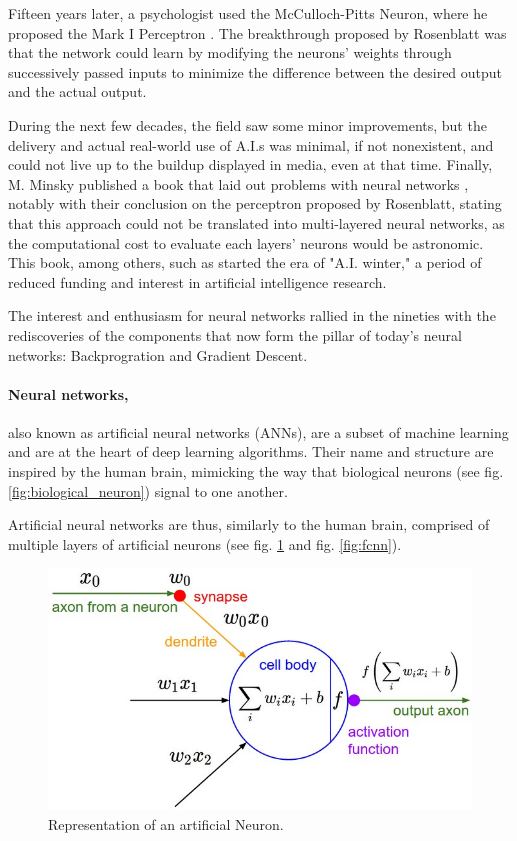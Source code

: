 Fifteen years later, a psychologist used the McCulloch-Pitts Neuron, where he
proposed the Mark I Perceptron \cite{brain_perceptron_1958}. The breakthrough
proposed by Rosenblatt was that the network could learn by modifying the
neurons' weights through successively passed inputs to minimize the difference
between the desired output and the actual output.

During the next few decades, the field saw some minor improvements, but the
delivery and actual real-world use of A.I.s was minimal, if not nonexistent, and
could not live up to the buildup displayed in media, even at that time. Finally,
M. Minsky published a book that laid out problems with neural networks
\cite{minsky_perceptrons_1969}, notably with their conclusion on the perceptron
proposed by Rosenblatt, stating that this approach could not be translated into
multi-layered neural networks, as the computational cost to evaluate each
layers' neurons would be astronomic. This book, among others, such as
\cite{haykin_neural_1994} started the era of "A.I. winter," a period of reduced
funding and interest in artificial intelligence research.

The interest and enthusiasm for neural networks rallied in the nineties with the
rediscoveries of the components that now form the pillar of today's neural
networks: Backprogration and Gradient Descent.


\paragraph{Neural networks,} also known as artificial neural networks (ANNs),
are a subset of machine learning and are at the heart of deep learning
algorithms. Their name and structure are inspired by the human brain, mimicking
the way that biological neurons (see fig. \ref{fig:biological_neuron}) signal to
one another.

Artificial neural networks are thus, similarly to the human brain, comprised of
multiple layers of artificial neurons (see fig. \ref{fig:artificial_neuron} and
fig. \ref{fig:fcnn}).

\begin{figure}[ht]
    \includegraphics[clip,width=1\columnwidth]{Figures/related/artificial_neuron.jpeg}
    \caption{ Representation of an artificial Neuron. }
    \label{fig:artificial_neuron}
\end{figure}

